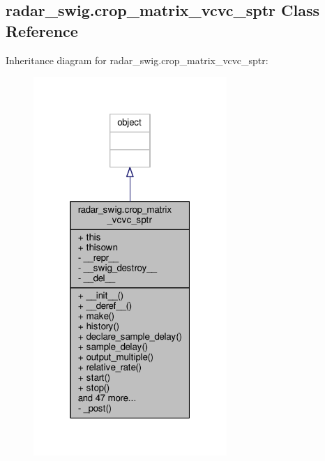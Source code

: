\subsection{radar\+\_\+swig.\+crop\+\_\+matrix\+\_\+vcvc\+\_\+sptr Class Reference}
\label{classradar__swig_1_1crop__matrix__vcvc__sptr}


Inheritance diagram for radar\+\_\+swig.\+crop\+\_\+matrix\+\_\+vcvc\+\_\+sptr\+:
\nopagebreak
\begin{figure}[H]
\begin{center}
\leavevmode
\includegraphics[width=208pt]{d5/d95/classradar__swig_1_1crop__matrix__vcvc__sptr__inherit__graph}
\end{center}
\end{figure}


